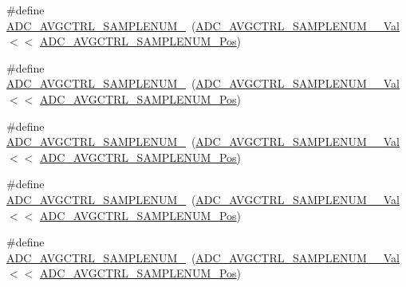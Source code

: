 \begin{DoxyCompactItemize}
\item 
\#define \mbox{\hyperlink{group___s_a_m_d21___a_d_c_ga62f0383bab27aa08277a7cbdec27e78e}{A\+D\+C\+\_\+\+A\+V\+G\+C\+T\+R\+L\+\_\+\+S\+A\+M\+P\+L\+E\+N\+U\+M\+\_}}~(\mbox{\hyperlink{group___s_a_m_d21___a_d_c_gac9caa4b313c212c56aa881082f2e37c9}{A\+D\+C\+\_\+\+A\+V\+G\+C\+T\+R\+L\+\_\+\+S\+A\+M\+P\+L\+E\+N\+U\+M\+\_\+\_\+\+Val}}  $<$$<$ \mbox{\hyperlink{group___s_a_m_d21___a_d_c_gae24ef894295278762f9293105f06ffb9}{A\+D\+C\+\_\+\+A\+V\+G\+C\+T\+R\+L\+\_\+\+S\+A\+M\+P\+L\+E\+N\+U\+M\+\_\+\+Pos}})
\item 
\#define \mbox{\hyperlink{group___s_a_m_d21___a_d_c_ga436c2afe4836fa1623bccb1fc07d423b}{A\+D\+C\+\_\+\+A\+V\+G\+C\+T\+R\+L\+\_\+\+S\+A\+M\+P\+L\+E\+N\+U\+M\+\_}}~(\mbox{\hyperlink{group___s_a_m_d21___a_d_c_gaa681a5f11f5f2c7147f8471caa9a1789}{A\+D\+C\+\_\+\+A\+V\+G\+C\+T\+R\+L\+\_\+\+S\+A\+M\+P\+L\+E\+N\+U\+M\+\_\+\_\+\+Val}}  $<$$<$ \mbox{\hyperlink{group___s_a_m_d21___a_d_c_gae24ef894295278762f9293105f06ffb9}{A\+D\+C\+\_\+\+A\+V\+G\+C\+T\+R\+L\+\_\+\+S\+A\+M\+P\+L\+E\+N\+U\+M\+\_\+\+Pos}})
\item 
\#define \mbox{\hyperlink{group___s_a_m_d21___a_d_c_ga3380fb38e09008b3df3557b4cd9ddd0c}{A\+D\+C\+\_\+\+A\+V\+G\+C\+T\+R\+L\+\_\+\+S\+A\+M\+P\+L\+E\+N\+U\+M\+\_}}~(\mbox{\hyperlink{group___s_a_m_d21___a_d_c_gafd0a9b19d5e189c78725643a1cd6fd62}{A\+D\+C\+\_\+\+A\+V\+G\+C\+T\+R\+L\+\_\+\+S\+A\+M\+P\+L\+E\+N\+U\+M\+\_\+\_\+\+Val}} $<$$<$ \mbox{\hyperlink{group___s_a_m_d21___a_d_c_gae24ef894295278762f9293105f06ffb9}{A\+D\+C\+\_\+\+A\+V\+G\+C\+T\+R\+L\+\_\+\+S\+A\+M\+P\+L\+E\+N\+U\+M\+\_\+\+Pos}})
\item 
\#define \mbox{\hyperlink{group___s_a_m_d21___a_d_c_ga18434217ff35675f7797c86a8e05f653}{A\+D\+C\+\_\+\+A\+V\+G\+C\+T\+R\+L\+\_\+\+S\+A\+M\+P\+L\+E\+N\+U\+M\+\_}}~(\mbox{\hyperlink{group___s_a_m_d21___a_d_c_ga7576edd68ace767f66faf2f7a1541565}{A\+D\+C\+\_\+\+A\+V\+G\+C\+T\+R\+L\+\_\+\+S\+A\+M\+P\+L\+E\+N\+U\+M\+\_\+\_\+\+Val}} $<$$<$ \mbox{\hyperlink{group___s_a_m_d21___a_d_c_gae24ef894295278762f9293105f06ffb9}{A\+D\+C\+\_\+\+A\+V\+G\+C\+T\+R\+L\+\_\+\+S\+A\+M\+P\+L\+E\+N\+U\+M\+\_\+\+Pos}})
\item 
\#define \mbox{\hyperlink{group___s_a_m_d21___a_d_c_gab15b347ffb5b2d2256157467830aa8b6}{A\+D\+C\+\_\+\+A\+V\+G\+C\+T\+R\+L\+\_\+\+S\+A\+M\+P\+L\+E\+N\+U\+M\+\_}}~(\mbox{\hyperlink{group___s_a_m_d21___a_d_c_ga7ce78bef6c6d6f18e696b10aae7d9dca}{A\+D\+C\+\_\+\+A\+V\+G\+C\+T\+R\+L\+\_\+\+S\+A\+M\+P\+L\+E\+N\+U\+M\+\_\+\_\+\+Val}} $<$$<$ \mbox{\hyperlink{group___s_a_m_d21___a_d_c_gae24ef894295278762f9293105f06ffb9}{A\+D\+C\+\_\+\+A\+V\+G\+C\+T\+R\+L\+\_\+\+S\+A\+M\+P\+L\+E\+N\+U\+M\+\_\+\+Pos}})
$$
\end{DoxyCompactItemize}
